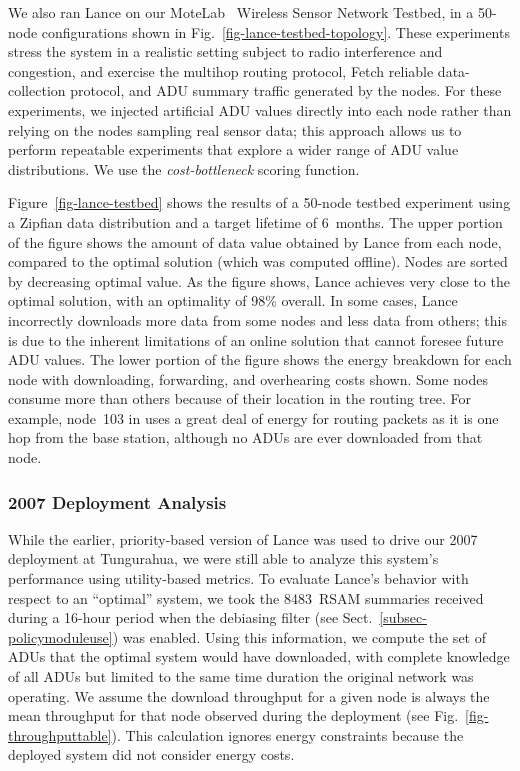 We also ran Lance on our MoteLab~\cite{motelab} Wireless Sensor Network
Testbed, in a 50-node configurations shown in
Fig.~\ref{fig-lance-testbed-topology}. These experiments stress the system in a
realistic setting subject to radio interference and congestion, and exercise
the multihop routing protocol, Fetch reliable data-collection protocol, and
ADU summary traffic generated by the nodes. For these experiments, we
injected artificial ADU values directly into each node rather than relying on
the nodes sampling real sensor data; this approach allows us to perform
repeatable experiments that explore a wider range of ADU value distributions.
We use the \emph{cost-bottleneck} scoring function. 

Figure~\ref{fig-lance-testbed} shows the results of a 50-node testbed
experiment using a Zipfian data distribution and a target lifetime of
6~months.  The upper portion of the figure shows the amount of data value
obtained by Lance from each node, compared to the optimal solution (which was
computed offline). Nodes are sorted by decreasing optimal value. As the
figure shows, Lance achieves very close to the optimal solution, with an
optimality of 98\% overall.  In some cases, Lance incorrectly downloads more
data from some nodes and less data from others; this is due to the inherent
limitations of an online solution that cannot foresee future ADU values.  The
lower portion of the figure shows the energy breakdown for each node with
downloading, forwarding, and overhearing costs shown.  Some nodes consume
more than others because of their location in the routing tree. For example,
node~103 in uses a great deal of energy for routing packets as it is one hop
from the base station, although no ADUs are ever downloaded from that node.

\subsubsection{2007 Deployment Analysis}

While the earlier, priority-based version of Lance was used to drive our 2007
deployment at Tungurahua, we were still able to analyze this system's
performance using utility-based metrics.  To evaluate Lance's behavior with
respect to an ``optimal'' system, we took the 8483~RSAM summaries received
during a 16-hour period when the debiasing filter (see
Sect.~\ref{subsec-policymoduleuse}) was enabled. Using this
information, we compute the set of ADUs that the optimal system would have
downloaded, with complete knowledge of all ADUs but limited to the same time
duration the original network was operating.  We assume the download
throughput for a given node is always the mean throughput for that node
observed during the deployment (see Fig.~\ref{fig-throughputtable}). This
calculation ignores energy constraints because the deployed system did not
consider energy costs.

